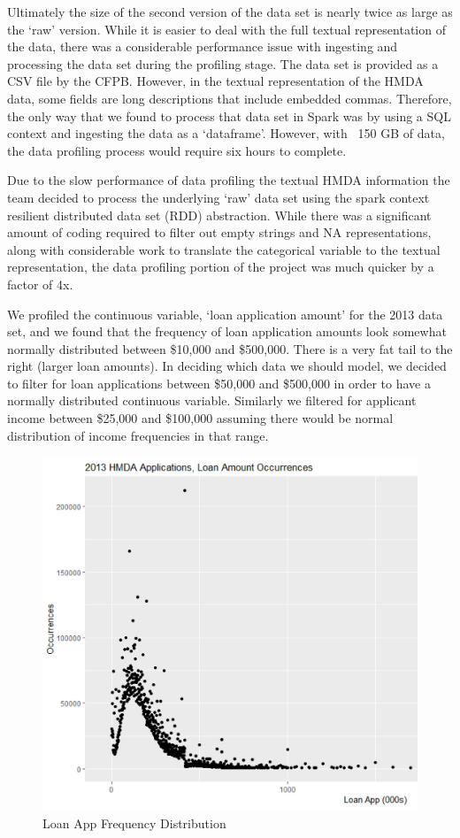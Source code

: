 \documentclass[conference,compsoc]{IEEEtran}
\begin{document}
Ultimately the size of the second version of the data set is nearly twice as large as the ‘raw’ version.  While it is easier to deal with the full textual representation of the data, there was a considerable performance issue with ingesting and processing the data set during the profiling stage.  The data set is provided as a CSV file by the CFPB.  However, in the textual representation of the HMDA data, some fields are long descriptions that include embedded commas.  Therefore, the only way that we found to process that data set in Spark was by using a SQL context and ingesting the data as a ‘dataframe’.  However, with ~150 GB of data, the data profiling process would require six hours to complete.  

Due to the slow performance of data profiling the textual HMDA information the team decided to process the underlying ‘raw’ data set using the spark context resilient distributed data set (RDD) abstraction.  While there was a significant amount of coding required to filter out empty strings and NA representations, along with considerable work to translate the categorical variable to the textual representation, the data profiling portion of the project was much quicker by a factor of 4x. 

We profiled the continuous variable, ‘loan application amount’ for the 2013 data set, and we found that the frequency of loan application amounts look somewhat normally distributed between \$10,000 and \$500,000.  There is a very fat tail to the right (larger loan amounts).  In deciding which data we should model, we decided to filter for loan applications between \$50,000 and \$500,000 in order to have a normally distributed continuous variable.  Similarly we filtered for applicant income between \$25,000 and \$100,000 assuming there would be normal distribution of income frequencies in that range. 

\begin{figure}[h!]
  \includegraphics[width=\linewidth]{Loan_App_Dist.jpg}
  \caption{Loan App Frequency Distribution}
  \label{fig:design}
\end{figure}
\end{document}
